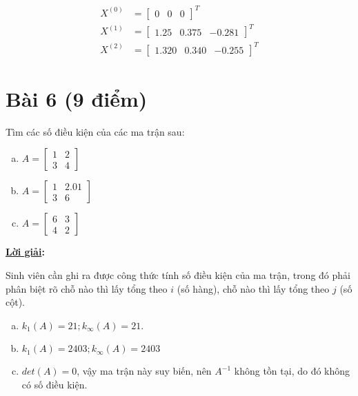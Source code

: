 \documentclass[12pt]{article}
\newcommand{\Solution}{
\medskip
{\bf \underline{Lời giải}:}
}
\begin{document}
\begin{enumerate}[a)]
\begin{align*}
X^{(0)} &= \begin{bmatrix} 
0 & 0 & 0 
\end{bmatrix}^T\\
X^{(1)} &= \begin{bmatrix}
1.25 & 0.375 & -0.281
\end{bmatrix}^T\\
X^{(2)} &= \begin{bmatrix}
1.320 & 0.340 & -0.255
\end{bmatrix}^T
\end{align*}

\end{enumerate}

\section{Bài 6 (9 điểm)}

Tìm các số điều kiện của các ma trận sau:

\begin{enumerate}[a)]

\item $A = \begin{bmatrix}  1 & 2\\ 3 & 4 \end{bmatrix}$

\item $A = \begin{bmatrix} 1 & 2.01 \\ 3 & 6\end{bmatrix}$

\item $A = \begin{bmatrix} 6 & 3 \\ 4 & 2\end{bmatrix}$

\end{enumerate}

\Solution

Sinh viên cần ghi ra được công thức tính số điều kiện của ma trận, trong đó phải phân biệt rõ chỗ nào thì lấy tổng theo $i$ (số hàng), chỗ nào thì lấy tổng theo $j$ (số cột).

\begin{enumerate}[a)]

\item $k_1(A)=21; k_{\infty}(A)=21$.

\item $k_1(A)=2403; k_{\infty}(A)=2403$

\item $det(A)=0$, vậy ma trận này suy biến, nên $A^{-1}$ không tồn tại, do đó không có số điều kiện.

\end{enumerate}
\end{document}
